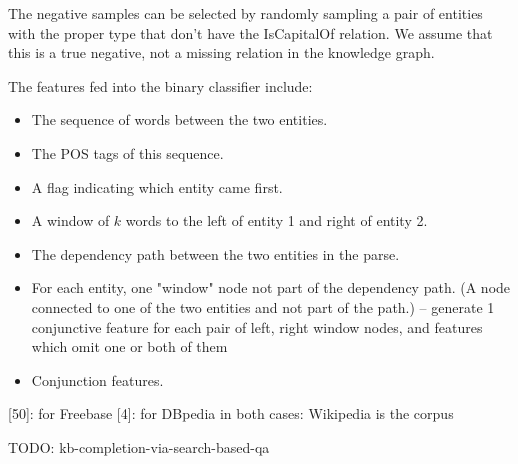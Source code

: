 The negative samples can be selected
by randomly sampling a pair of entities with the proper type that don't have the
IsCapitalOf relation. We assume that this is a true negative, not a missing
relation in the knowledge graph.

The features fed into the binary classifier include:
\begin{itemize}
\item The sequence of words between the two entities.
\item The POS tags of this sequence.
\item A flag indicating which entity came first.
\item A window of $k$ words to the left of entity 1 and right of entity 2.
\item The dependency path between the two entities in the parse.
\item For each entity, one "window" node not part of the dependency path.
	(A node connected to one of the two entities and not part of the path.)
		-- generate 1 conjunctive feature for each pair of left, right
		window nodes, and features which omit one or both of them
	\cite{distant-supervision}
\item Conjunction features.
\end{itemize}

[50]: for Freebase
[4]: for DBpedia
in both cases: Wikipedia is the corpus

TODO: kb-completion-via-search-based-qa
